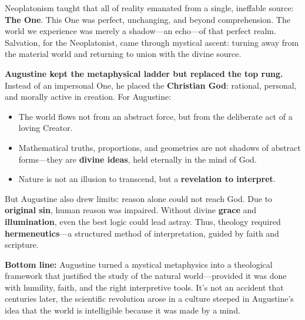 \begin{tcolorbox}[
    colback=blue!5!white,
    colframe=blue!75!black,
    title=Sidebar: From the One to the Word — Augustine’s Theological Upgrade of Neoplatonism,
    fonttitle=\bfseries,
    sharp corners,
    boxrule=0.7pt,
    breakable
  ]
  
  Neoplatonism taught that all of reality emanated from a single, ineffable source: \textbf{The One}. This One was perfect, unchanging, and beyond comprehension. The world we experience was merely a shadow—an echo—of that perfect realm. Salvation, for the Neoplatonist, came through mystical ascent: turning away from the material world and returning to union with the divine source.
  
  \medskip
  
  \textbf{Augustine kept the metaphysical ladder but replaced the top rung.} Instead of an impersonal One, he placed the \textbf{Christian God}: rational, personal, and morally active in creation. For Augustine:
  
  \begin{itemize}
      \item The world flows not from an abstract force, but from the deliberate act of a loving Creator.
      \item Mathematical truths, proportions, and geometries are not shadows of abstract forms—they are \textbf{divine ideas}, held eternally in the mind of God.
      \item Nature is not an illusion to transcend, but a \textbf{revelation to interpret}.
  \end{itemize}
  
  But Augustine also drew limits: reason alone could not reach God. Due to \textbf{original sin}, human reason was impaired. Without divine \textbf{grace} and \textbf{illumination}, even the best logic could lead astray. Thus, theology required \textbf{hermeneutics}—a structured method of interpretation, guided by faith and scripture.
  
  \medskip
  
  \textbf{Bottom line:} Augustine turned a mystical metaphysics into a theological framework that justified the study of the natural world—provided it was done with humility, faith, and the right interpretive tools. It’s not an accident that centuries later, the scientific revolution arose in a culture steeped in Augustine’s idea that the world is intelligible because it was made by a mind.
  
  \end{tcolorbox}

